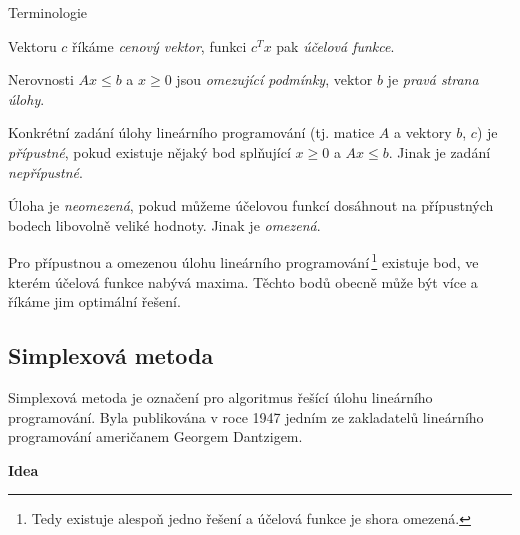 \medskip
{}

\noindent\textsf{Terminologie}
\begin{penumerate}
 \item Vektoru $c$ říkáme {\it cenový vektor}, funkci $c^Tx$ pak {\it účelová funkce}.
 \item Nerovnosti $Ax\leq b$ a $x\geq 0$ jsou {\it omezující podmínky}, vektor $b$ je {\it pravá strana úlohy}.
 \item Konkrétní zadání úlohy lineárního programování (tj. matice $A$ a vektory $b$, $c$) je {\it přípustné},
pokud existuje nějaký bod splňující $x\geq 0$ a $Ax\leq b$. Jinak je zadání {\it nepřípustné}.
 \item Úloha je {\it neomezená}, pokud můžeme účelovou funkcí dosáhnout na přípustných bodech libovolně veliké hodnoty.
Jinak je {\it omezená}.
\end{penumerate}

\begin{veta}
Pro přípustnou a omezenou úlohu lineárního programování\,\footnote{Tedy existuje alespoň jedno řešení
a účelová funkce je shora omezená.} existuje bod, ve kterém účelová funkce nabývá maxima. Těchto
bodů obecně může být více a říkáme jim optimální řešení.
\end{veta}

\subsection{Simplexová metoda}

Simplexová metoda je označení pro algoritmus řešící úlohu lineárního programování. Byla publikována
v roce 1947 jedním ze zakladatelů lineárního programování američanem Georgem Dantzigem.

\medskip
\begin{center}
{\bf\textsf{Idea}}
\end{center}

